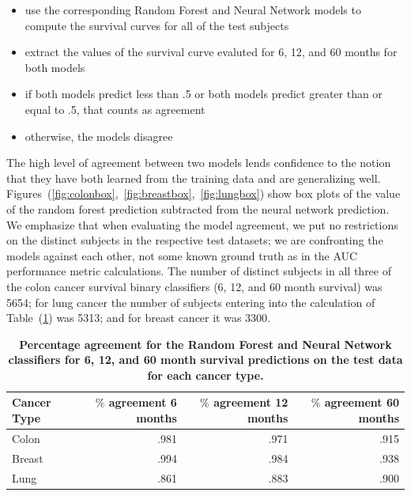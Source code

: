 \documentclass[10pt,letterpaper]{article}
\begin{document}
\begin{itemize}[noitemsep]
\item use the corresponding Random Forest and Neural Network models to compute the survival curves for all of the test subjects
\item extract the values of the survival curve evaluted for 6, 12, and 60 months for both models
\item if both models predict less than .5 or both models predict greater than or equal to .5, that counts as agreement
\item otherwise, the models disagree
\end{itemize}


The high level of agreement between two models lends confidence to the notion that they have both learned from the training data and are generalizing well. Figures~(\ref{fig:colonbox},~\ref{fig:breastbox},~\ref{fig:lungbox}) 
show box plots of the value of the random forest prediction subtracted from the neural network prediction.
We emphasize that when evaluating the model agreement, we put no restrictions on the distinct subjects in the respective test datasets; we are confronting the models against each other, not some known ground truth as in the AUC performance metric calculations. The number of distinct subjects in all three of the colon cancer survival binary classifiers (6, 12, and 60 month survival) was 5654; for lung cancer the number of subjects entering into the calculation of Table~(\ref{tab:agree})
 was 5313; and for breast cancer it was 3300.


\begin{table}[!ht]
\begin{adjustwidth}{-2.25in}{0in} %
\caption{\label{tab:agree} {\bf Percentage agreement for the Random Forest and Neural Network classifiers for 6, 12, and 60 month survival predictions on the test data for each cancer type.}}
\begin{tabular}{lrrr}
\toprule
Cancer Type & $\%$ agreement 6 months & $\%$ agreement 12 months & $\%$ agreement 60 months \\ 
\midrule
Colon & .981 & .971 & .915 \\  
Breast & .994 & .984 & .938 \\  
Lung & .861 & .883 & .900 \\  
\bottomrule
\end{tabular}
\end{adjustwidth}
\end{table}
\end{document}
